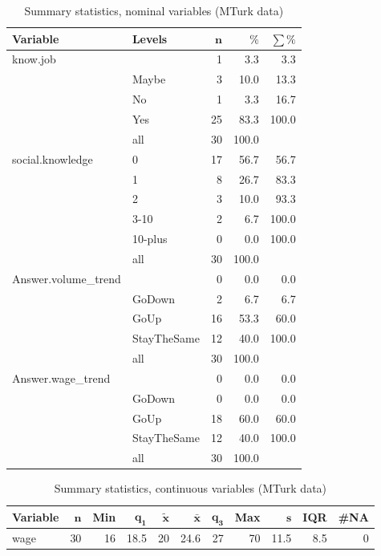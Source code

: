 \documentclass[a4paper,10pt]{article}\usepackage[]{graphicx}\usepackage[]{color}
\begin{document}
\begin{table}[ht]
\centering
{\footnotesize
\begin{tabular}{ll|rrr}
 \textbf{Variable} & \textbf{Levels} & $\mathbf{n}$ & $\mathbf{\%}$ & $\mathbf{\sum \%}$ \\ 
  \hline
know.job &  & 1 & 3.3 & 3.3 \\ 
   & Maybe & 3 & 10.0 & 13.3 \\ 
   & No & 1 & 3.3 & 16.7 \\ 
   & Yes & 25 & 83.3 & 100.0 \\ 
   \hline
 & all & 30 & 100.0 &  \\ 
   \hline
\hline
social.knowledge & 0 & 17 & 56.7 & 56.7 \\ 
   & 1 & 8 & 26.7 & 83.3 \\ 
   & 2 & 3 & 10.0 & 93.3 \\ 
   & 3-10 & 2 & 6.7 & 100.0 \\ 
   & 10-plus & 0 & 0.0 & 100.0 \\ 
   \hline
 & all & 30 & 100.0 &  \\ 
   \hline
\hline
Answer.volume\_trend &  & 0 & 0.0 & 0.0 \\ 
   & GoDown & 2 & 6.7 & 6.7 \\ 
   & GoUp & 16 & 53.3 & 60.0 \\ 
   & StayTheSame & 12 & 40.0 & 100.0 \\ 
   \hline
 & all & 30 & 100.0 &  \\ 
   \hline
\hline
Answer.wage\_trend &  & 0 & 0.0 & 0.0 \\ 
   & GoDown & 0 & 0.0 & 0.0 \\ 
   & GoUp & 18 & 60.0 & 60.0 \\ 
   & StayTheSame & 12 & 40.0 & 100.0 \\ 
   \hline
 & all & 30 & 100.0 &  \\ 
   \hline
\hline
\end{tabular}
}
\caption{Summary statistics, nominal variables (MTurk data)} 
\label{tab1:21-1010}
\end{table}
\begin{table}[ht]
\centering
{\footnotesize
\begin{tabular}{lrrrrrrrrrr}
 \textbf{Variable} & $\mathbf{n}$ & \textbf{Min} & $\mathbf{q_1}$ & $\mathbf{\widetilde{x}}$ & $\mathbf{\bar{x}}$ & $\mathbf{q_3}$ & \textbf{Max} & $\mathbf{s}$ & \textbf{IQR} & \textbf{\#NA} \\ 
  \hline
wage & 30 & 16 & 18.5 & 20 & 24.6 & 27 & 70 & 11.5 & 8.5 & 0 \\ 
  \end{tabular}
}
\caption{Summary statistics, continuous variables (MTurk data)} 
\label{tab2:21-1010}
\end{table}
\end{document}
